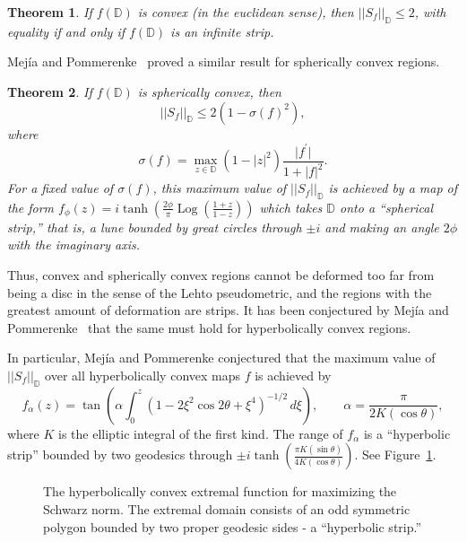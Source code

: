 \documentclass{lms}
\newcommand{\D}{\mathbb D}
\newcommand{\abs}[1]{\lvert#1\rvert}
\newcommand{\norm}[1]{\lvert\lvert#1\rvert\rvert}
\newcommand{\Snf}{\norm{S_f}_\D}
\newtheorem{theorem}{Theorem}[section]
\DeclareMathOperator{\Log}{Log}
\numberwithin{equation}{section}
\begin{document}
\begin{theorem} If $f(\D)$ is convex (in the euclidean sense),
 then $\Snf\leq 2$, with equality if and
only if $f(\D)$ is an infinite strip.
\end{theorem}

Mej\'ia and Pommerenke~\cite{MP00b} proved a similar result for spherically 
convex regions.

\begin{theorem} 
If $f(\D)$ is spherically convex, then 
\[
\norm{S_f}_\D \leq 2(1-\sigma(f)^2),
\]
where 
\[
\sigma(f)=\max_{z\in\D} (1-\abs{z}^2)\frac{\abs{f^\prime}}{1+\abs{f}^2}.
\]
For a fixed value of $\sigma(f)$, this
 maximum value of $\Snf$ is achieved by a map of the form
$f_\phi(z)=i\tanh\left(\frac{2\phi}{\pi}\Log
\left(\frac{1+z}{1-z}\right)\right)$ which takes $\D$ onto a 
 ``spherical strip,'' that is, a lune bounded by great circles through
$\pm i$ and making an angle $2\phi$ with the imaginary axis.
\end{theorem}

Thus, convex and spherically convex regions cannot be deformed
 too far from being a disc
in the sense of the Lehto pseudometric, and the regions 
with the greatest amount of deformation
are strips.  It has been conjectured by Mej\'ia and 
Pommerenke~\cite{MP00,PM00,MP01}
that the same must hold for hyperbolically
convex regions.  


In particular, Mej\'ia and Pommerenke conjectured that the maximum value
of $\Snf$ over all hyperbolically convex maps $f$ is achieved by 
\begin{equation}\label{E:f_alpha}
f_\alpha(z) =\tan\left( \alpha\int_0^z \left(1-2\xi^2\cos 2\theta+\xi^4
\right)^{-1/2}\,d\xi \right),  \qquad \alpha  = \frac{\pi}{2K(\cos \theta)},
\end{equation}
where $K$ is the elliptic integral of the first kind.
The range of $f_\alpha$ is a ``hyperbolic strip''
bounded by two geodesics through $\pm i \tanh 
\left(\frac{\pi K(\sin\theta)}{4K(\cos\theta)}\right)$.
See Figure~\ref{F:strip}.

\begin{figure}
\begin{center}
\caption{The hyperbolically convex extremal function for maximizing
  the Schwarz norm.  The extremal domain consists of an odd symmetric  polygon bounded by two proper geodesic sides - a ``hyperbolic strip.''}
\label{F:strip}
\end{center}
\end{figure}
\end{document}

